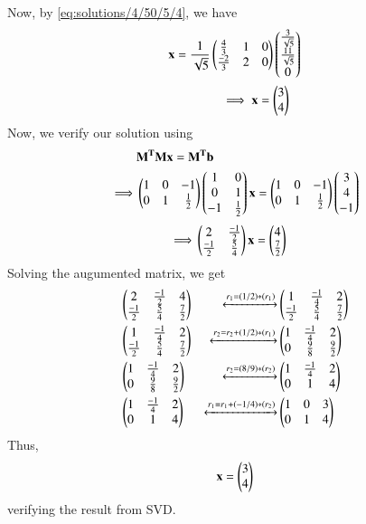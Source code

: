 Now, by \eqref{eq:solutions/4/50/5/4}, we have
\begin{align}
& \mathbf{x} = \frac{1}{\sqrt{5}}\begin{pmatrix}\frac{4}{3} & 1 &0 \\ \frac{-2}{3} & 2 & 0 \end{pmatrix} 
\begin{pmatrix}\frac{3}{\sqrt{5}} \\ \frac{11}{\sqrt{5}} \\ 0\end{pmatrix}  \\
& \qquad \qquad \implies \mathbf{x} = \begin{pmatrix}3 \\ 4\end{pmatrix}
\end{align}
Now, we verify our solution using
\begin{align}
&	\mathbf{M^TMx = M^Tb} \\
\implies & \begin{pmatrix}1 & 0 & -1  \\ 0 & 1 & \frac{1}{2} \end{pmatrix}\begin{pmatrix}1 & 0 \\ 0 & 1 \\ -1 & \frac{1}{2} \end{pmatrix}\mathbf{x} = \begin{pmatrix}1 & 0 & -1  \\ 0 & 1 & \frac{1}{2} \end{pmatrix}\begin{pmatrix}3 \\4\\-1\end{pmatrix} 
\end{align}
\begin{align}
\implies & \begin{pmatrix}2 & \frac{-1}{2} \\ \frac{-1}{2} & \frac{5}{4}\end{pmatrix}\mathbf{x} =\begin{pmatrix}4 \\\frac{7}{2}\end{pmatrix}
\end{align}
Solving the augumented matrix, we get
\begin{align}
& \begin{pmatrix}2 & \frac{-1}{2} & 4 \\ \frac{-1}{2} & \frac{5}{4} & \frac{7}{2}\end{pmatrix} 
&\xleftrightarrow[]{r_1 = (1/2)*(r_1) } & \begin{pmatrix}1 & \frac{-1}{4} & 2 \\ \frac{-1}{2} & \frac{5}{4} & \frac{7}{2}\end{pmatrix} \\
& \begin{pmatrix}1 & \frac{-1}{4} & 2 \\ \frac{-1}{2} & \frac{5}{4} & \frac{7}{2}\end{pmatrix} & \xleftrightarrow[]{r_2 = r_2 + (1/2)*(r_1)} & \begin{pmatrix}1 & \frac{-1}{4} & 2 \\ 0 & \frac{9}{8} & \frac{9}{2}\end{pmatrix} \\
&\begin{pmatrix}1 & \frac{-1}{4} & 2 \\ 0 & \frac{9}{8} & \frac{9}{2}\end{pmatrix} &\xleftrightarrow[]{r_2 =(8/9)*(r_2)} & \begin{pmatrix}1 & \frac{-1}{4} & 2 \\ 0 & 1 & 4\end{pmatrix} \\
& \begin{pmatrix}1 & \frac{-1}{4} & 2 \\ 0 & 1 & 4\end{pmatrix} &\xleftrightarrow[]{r_1 = r_1 + (-1/4)*(r_2)} & \begin{pmatrix}1 & 0 & 3 \\ 0 & 1 & 4\end{pmatrix}
\end{align}
Thus,
\begin{align}
	\mathbf{x} = \begin{pmatrix}3\\4\end{pmatrix} 
\end{align}
verifying the result from SVD.

